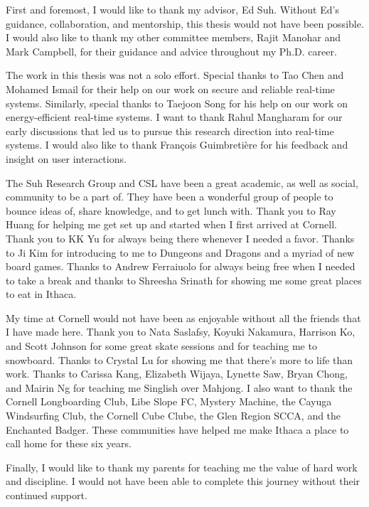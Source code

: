 First and foremost, I would like to thank my advisor, Ed Suh. Without Ed's
guidance, collaboration, and mentorship, this thesis would not have been
possible. I would also like to thank my other committee members, Rajit Manohar and Mark
Campbell, for their guidance and advice throughout my Ph.D. career.

The work in this thesis was not a solo effort. Special thanks to Tao Chen and
Mohamed Ismail for their help on our work on secure and reliable real-time
systems. Similarly, special thanks to Taejoon Song for his help on our work on
energy-efficient real-time systems.  I want to thank Rahul Mangharam for our
early discussions that led us to pursue this research direction into real-time
systems.  I would also like to thank Fran\c{c}ois Guimbreti\`{e}re for his
feedback and insight on user interactions. 

The Suh Research Group and CSL have been a great academic, as well as
social, community to be a part of. They have been a wonderful group of people
to bounce ideas of, share knowledge, and to get lunch with. 
Thank you to Ray Huang for helping me get set up and started when I first
arrived at Cornell.  Thank you to KK Yu for always being there whenever I
needed a favor. Thanks to Ji Kim for introducing to me to Dungeons and Dragons
and a myriad of new board games.  Thanks to Andrew Ferraiuolo for always being
free when I needed to take a break and thanks to Shreesha Srinath for showing me
some great places to eat in Ithaca.

My time at Cornell would not have been as enjoyable without all the friends that I have made here.
Thank you to Nata Saslafsy, Koyuki Nakamura, Harrison Ko, and Scott Johnson for
some great skate sessions and for teaching me to snowboard. 
Thanks to Crystal Lu for showing me that there's more to life than work.
Thanks to Carissa Kang, Elizabeth Wijaya, Lynette Saw, Bryan Chong, and Mairin
Ng for teaching me Singlish over Mahjong.
I also want to thank the Cornell Longboarding Club, Libe Slope FC, Mystery
Machine, the Cayuga Windsurfing Club, the Cornell Cube Clube, the Glen Region
SCCA, and the Enchanted Badger. These communities have helped me make Ithaca a
place to call home for these six years.


Finally, I would like to thank my parents for teaching me the value of hard
work and discipline. I would not have been able to complete this journey
without their continued support.

